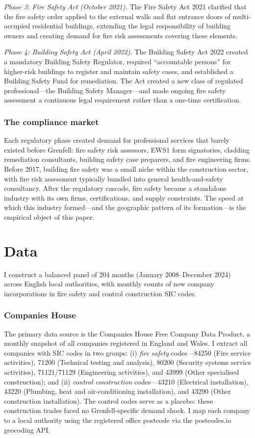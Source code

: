 \documentclass[12pt]{article}
\begin{document}
\textit{Phase 3: Fire Safety Act (October 2021).} The Fire Safety Act 2021 \citep{fire_safety_act_2021} clarified that the fire safety order applied to the external walls and flat entrance doors of multi-occupied residential buildings, extending the legal responsibility of building owners and creating demand for fire risk assessments covering these elements.

\textit{Phase 4: Building Safety Act (April 2022).} The Building Safety Act 2022 \citep{building_safety_act_2022} created a mandatory Building Safety Regulator, required ``accountable persons'' for higher-risk buildings to register and maintain safety cases, and established a Building Safety Fund for remediation. The Act created a new class of regulated professional---the Building Safety Manager---and made ongoing fire safety assessment a continuous legal requirement rather than a one-time certification.

\subsubsection*{The compliance market} Each regulatory phase created demand for professional services that barely existed before Grenfell: fire safety risk assessors, EWS1 form signatories, cladding remediation consultants, building safety case preparers, and fire engineering firms. Before 2017, building fire safety was a small niche within the construction sector, with fire risk assessment typically bundled into general health-and-safety consultancy. After the regulatory cascade, fire safety became a standalone industry with its own firms, certifications, and supply constraints. The speed at which this industry formed---and the geographic pattern of its formation---is the empirical object of this paper.


\section{Data}

I construct a balanced panel of 204 months (January 2008--December 2024) across English local authorities, with monthly counts of new company incorporations in fire safety and control construction SIC codes.

\subsubsection*{Companies House} The primary data source is the Companies House Free Company Data Product, a monthly snapshot of all companies registered in England and Wales. I extract all companies with SIC codes in two groups: (i) \textit{fire safety} codes---84250 (Fire service activities), 71200 (Technical testing and analysis), 80200 (Security systems service activities), 71121/71129 (Engineering activities), and 43999 (Other specialised construction); and (ii) \textit{control construction} codes---43210 (Electrical installation), 43220 (Plumbing, heat and air-conditioning installation), and 43290 (Other construction installation). The control codes serve as a placebo: these construction trades faced no Grenfell-specific demand shock. I map each company to a local authority using the registered office postcode via the postcodes.io geocoding API.
\end{document}
